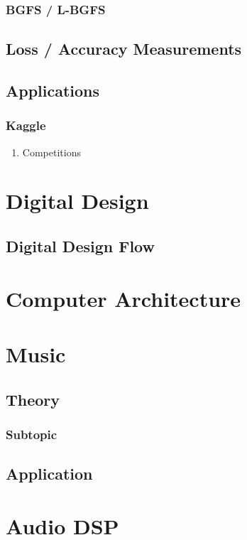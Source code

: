 \documentclass[11pt]{article}
\begin{document}
\subsubsection{BGFS / L-BGFS}
\label{sec:org6d566c3}
\subsection{Loss / Accuracy Measurements}
\label{sec:org896c7f7}
\subsection{Applications}
\label{sec:org6e1ad39}
\subsubsection{Kaggle}
\label{sec:orgf7c7225}
\begin{enumerate}
\item Competitions
\label{sec:org1a7e6d2}
\end{enumerate}
\section{Digital Design}
\label{sec:org78338d1}
\subsection{Digital Design Flow}
\label{sec:org5ced34d}
\section{Computer Architecture}
\label{sec:org11e48fb}
\section{Music}
\label{sec:org6c9a902}
\subsection{Theory}
\label{sec:org752451f}
\subsubsection{Subtopic}
\label{sec:orgf0210b5}
\subsection{Application}
\label{sec:org11c723b}
\section{Audio DSP}
\label{sec:org933b0c2}
\end{document}
